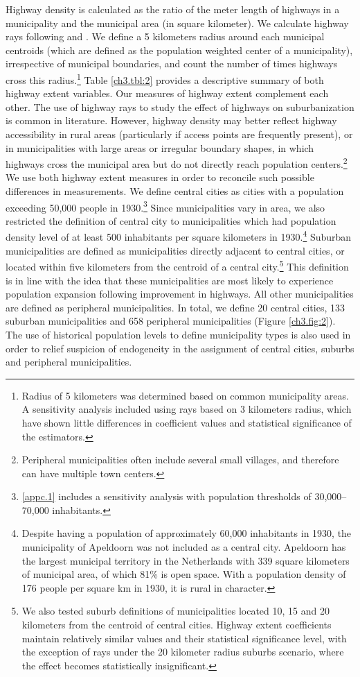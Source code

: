 \documentclass[a4paper,authoryear,review]{elsarticle}  	%
\begin{document}
	Highway density is calculated as the ratio of the meter length of highways in a municipality and the municipal area (in square kilometer). We calculate highway rays following \citet{Baum-Snow2007} and \citet{Baum-Snow2012}. We define a 5 kilometers radius around each municipal centroids (which are defined as the population weighted center of a municipality), irrespective of municipal boundaries, and count the number of times highways cross this radius.\footnote{Radius of 5 kilometers was determined based on common municipality areas. A sensitivity analysis included using rays based on 3 kilometers radius, which have shown little differences in coefficient values and statistical significance of the estimators.} Table \ref{ch3.tbl:2} provides a descriptive summary of both highway extent variables. Our measures of highway extent complement each other. The use of highway rays to study the effect of highways on suburbanization is common in literature. However, highway density may better reflect highway accessibility in rural areas (particularly if access points are frequently present), or in municipalities with large areas or irregular boundary shapes, in which highways cross the municipal area but do not directly reach population centers.\footnote{Peripheral municipalities often include several small villages, and therefore can have multiple town centers.} We use both highway extent measures in order to reconcile such possible differences in measurements. We define central cities as cities with a population exceeding 50,000 people in 1930.\footnote{\ref{appc.1} includes a sensitivity analysis with population thresholds of 30,000--70,000 inhabitants.} Since municipalities vary in area, we also restricted the definition of central city to municipalities which had population density level of at least 500 inhabitants per square kilometers in 1930.\footnote{Despite having a population of approximately 60,000 inhabitants in 1930, the municipality of Apeldoorn was not included as a central city. Apeldoorn has the largest municipal territory in the Netherlands with 339 square kilometers of municipal area, of which 81\% is open space. With a population density of 176 people per square km in 1930, it is rural in character.}		
	Suburban municipalities are defined as municipalities directly adjacent to central cities, or located within five kilometers from the centroid of a central city.\footnote{We also tested suburb definitions of municipalities located 10, 15 and 20 kilometers from the centroid of central cities. Highway extent coefficients maintain relatively similar values and their statistical significance level, with the exception of rays under the 20 kilometer radius suburbs scenario, where the effect becomes statistically insignificant.} This definition is in line with the idea that these municipalities are most likely to experience population expansion following improvement in highways. All other municipalities are defined as peripheral municipalities. In total, we define 20 central cities, 133 suburban municipalities and 658 peripheral municipalities (Figure \ref{ch3.fig:2}).
	The use of historical population levels to define municipality types is also used in order to relief suspicion of endogeneity in the assignment of central cities, suburbs and peripheral municipalities.
		
\end{document}
